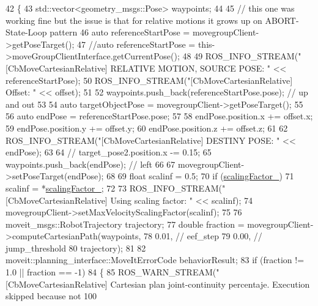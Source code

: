 \begin{DoxyCode}
42 \{
43   std::vector<geometry\_msgs::Pose> waypoints;
44 
45   \textcolor{comment}{// this one was working fine but the issue is that for relative motions it grows up on ABORT-State-Loop
       pattern}
46   \textcolor{keyword}{auto} referenceStartPose = movegroupClient->getPoseTarget(); 
47   \textcolor{comment}{//auto referenceStartPose = this->moveGroupClientInterface.getCurrentPose();}
48 
49   ROS\_INFO\_STREAM(\textcolor{stringliteral}{"[CbMoveCartesianRelative] RELATIVE MOTION, SOURCE POSE: "} << referenceStartPose);
50   ROS\_INFO\_STREAM(\textcolor{stringliteral}{"[CbMoveCartesianRelative] Offset: "} << offset);
51 
52   waypoints.push\_back(referenceStartPose.pose);  \textcolor{comment}{// up and out}
53 
54   \textcolor{keyword}{auto} targetObjectPose = movegroupClient->getPoseTarget();
55 
56   \textcolor{keyword}{auto} endPose = referenceStartPose.pose;
57 
58   endPose.position.x += offset.x;
59   endPose.position.y += offset.y;
60   endPose.position.z += offset.z;
61 
62   ROS\_INFO\_STREAM(\textcolor{stringliteral}{"[CbMoveCartesianRelative] DESTINY POSE: "} << endPose);
63 
64   \textcolor{comment}{// target\_pose2.position.x -= 0.15;}
65   waypoints.push\_back(endPose);  \textcolor{comment}{// left}
66 
67   movegroupClient->setPoseTarget(endPose);
68 
69   \textcolor{keywordtype}{float} scalinf = 0.5;
70   \textcolor{keywordflow}{if} (\hyperlink{classmove__group__interface__client_1_1CbMoveCartesianRelative_a62cdf88c437312ac79c8acc01519d634}{scalingFactor\_})
71     scalinf = *\hyperlink{classmove__group__interface__client_1_1CbMoveCartesianRelative_a62cdf88c437312ac79c8acc01519d634}{scalingFactor\_};
72 
73   ROS\_INFO\_STREAM(\textcolor{stringliteral}{"[CbMoveCartesianRelative] Using scaling factor: "} << scalinf);
74   movegroupClient->setMaxVelocityScalingFactor(scalinf);
75 
76   moveit\_msgs::RobotTrajectory trajectory;
77   \textcolor{keywordtype}{double} fraction = movegroupClient->computeCartesianPath(waypoints,
78                                                           0.01,  \textcolor{comment}{// eef\_step}
79                                                           0.00,  \textcolor{comment}{// jump\_threshold}
80                                                           trajectory);
81 
82   moveit::planning\_interface::MoveItErrorCode behaviorResult;
83   \textcolor{keywordflow}{if} (fraction != 1.0 || fraction == -1)
84   \{
85     ROS\_WARN\_STREAM(\textcolor{stringliteral}{"[CbMoveCartesianRelative] Cartesian plan joint-continuity percentaje. Execution
       skipped because not 100%
}
\end{DoxyCode}
